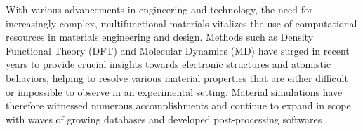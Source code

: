 \documentclass[%
 reprint,
 amsmath,amssymb,
 aps,
]{revtex4-1}
\begin{document}

With various advancements in engineering and technology, the need for increasingly complex, multifunctional materials vitalizes the use of computational resources in materials engineering and design. Methods such as Density Functional Theory (DFT) and Molecular Dynamics (MD) have surged in recent years to provide crucial insights towards electronic structures and atomistic behaviors, helping to resolve various material properties that are either difficult or impossible to observe in an experimental setting. Material simulations have therefore witnessed numerous accomplishments and continue to expand in scope with waves of growing databases \cite{2013_Jain, 2013_Saal, 2016_Gorai, 2015_Kirklin} and developed post-processing softwares \cite{2013_Ong, 2017_Goyal, 2018_Broberg, 2018_Naik, 2018_Ward}.


\end{document}
